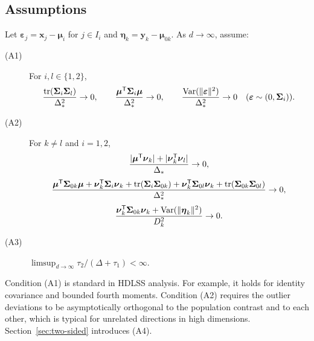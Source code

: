 \subsection{Assumptions}
Let $\boldsymbol\varepsilon_j=\boldsymbol x_j-\boldsymbol\mu_i$ for $j\in I_i$ and $\boldsymbol\eta_k=\boldsymbol y_k-\boldsymbol\mu_{0k}$. As $d\to\infty$, assume:
\begin{description}
\item[(A1)] For $i,l\in\{1,2\}$,
\[
{\operatorname{tr}(\boldsymbol\Sigma_i\boldsymbol\Sigma_l)\over\Delta_*^2}\to0,
\qquad
{\boldsymbol\mu^{\mathsf{T}}\boldsymbol\Sigma_i\boldsymbol\mu\over\Delta_*^2}\to0,
\qquad
{\operatorname{Var}(\lVert\boldsymbol\varepsilon\rVert^2)\over\Delta_*^2}\to0
\quad(\boldsymbol\varepsilon\sim(0,\boldsymbol\Sigma_i)).
\]
\item[(A2)] For $k\ne l$ and $i=1,2$,
\[
{\lvert\boldsymbol\mu^{\mathsf{T}}\boldsymbol\nu_k\rvert+\lvert\boldsymbol\nu_k^{\mathsf{T}}\boldsymbol\nu_l\rvert\over\Delta_*}\to0,
\]
\[
{\boldsymbol\mu^{\mathsf{T}}\boldsymbol\Sigma_{0k}\boldsymbol\mu+
\boldsymbol\nu_k^{\mathsf{T}}\boldsymbol\Sigma_i\boldsymbol\nu_k+
\operatorname{tr}(\boldsymbol\Sigma_i\boldsymbol\Sigma_{0k})+
\boldsymbol\nu_k^{\mathsf{T}}\boldsymbol\Sigma_{0l}\boldsymbol\nu_k+
\operatorname{tr}(\boldsymbol\Sigma_{0k}\boldsymbol\Sigma_{0l})
\over\Delta_*^2}\to0,
\]
\[
{\boldsymbol\nu_k^{\mathsf{T}}\boldsymbol\Sigma_{0k}\boldsymbol\nu_k+
\operatorname{Var}(\lVert\boldsymbol\eta_k\rVert^2)
\over D_k^2}\to0.
\]
\item[(A3)] $\limsup_{d\to\infty}\tau_2/(\Delta+\tau_1)<\infty$.
\end{description}
Condition (A1) is standard in HDLSS analysis. For example, it holds for identity covariance and bounded fourth moments. Condition (A2) requires the outlier deviations to be asymptotically orthogonal to the population contrast and to each other, which is typical for unrelated directions in high dimensions. Section~\ref{sec:two-sided} introduces (A4).

